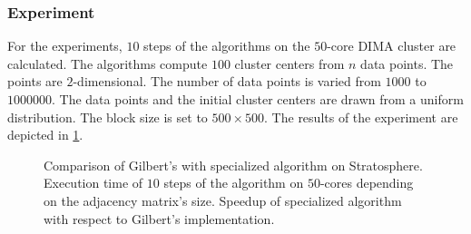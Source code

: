 \subsubsection{Experiment}

For the experiments, $10$ steps of the \kmeans algorithms on the $50$-core DIMA cluster are calculated.
The algorithms compute $100$ cluster centers from $n$ data points.
The points are $2$-dimensional.
The number of data points is varied from $1000$ to $1000000$.
The data points and the initial cluster centers are drawn from a uniform distribution.
The block size is set to $500\times 500$.
The results of the experiment are depicted in \cref{fig:kmeansResult}.

\begin{figure}
	\centering
	\begin{subfigure}[h]{\dualpgfwidth}
		\caption{}
		\label{fig:kmeansResult}
	\end{subfigure}
	\begin{subfigure}[h]{\dualpgfwidth}
		\caption{}
		\label{fig:kmeansSpeedup}
	\end{subfigure}
	\caption{Comparison of Gilbert's \kmeans with specialized algorithm on Stratosphere.  Execution time of $10$ steps of the \kmeans algorithm on $50$-cores depending on the adjacency matrix's size.  Speedup of specialized algorithm with respect to Gilbert's implementation.}
	\label{fig:kmeansBenchmark}
\end{figure}

